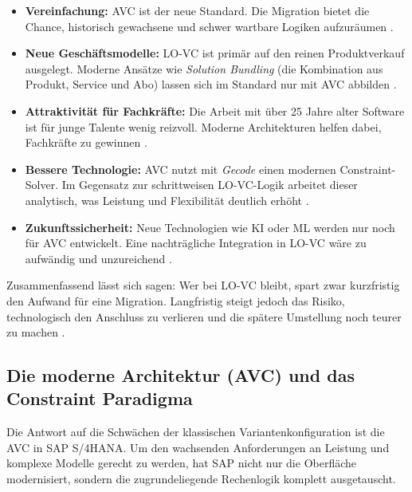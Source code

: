 \begin{itemize}
\item \textbf{Vereinfachung:} \ac{AVC} ist der neue Standard. Die Migration bietet die Chance, historisch gewachsene und schwer wartbare Logiken aufzuräumen \parencite[S. 57]{blumohrAdvancedVariantConfiguration2023}.
\item \textbf{Neue Geschäftsmodelle:} \ac{LO-VC} ist primär auf den reinen Produktverkauf ausgelegt. Moderne Ansätze wie \textit{Solution Bundling} (die Kombination aus Produkt, Service und Abo) lassen sich im Standard nur mit \ac{AVC} abbilden \parencite[S. 59]{blumohrAdvancedVariantConfiguration2023}.
\item \textbf{Attraktivität für Fachkräfte:} Die Arbeit mit über 25 Jahre alter Software ist für junge Talente wenig reizvoll. Moderne Architekturen helfen dabei, Fachkräfte zu gewinnen \parencite[S. 60]{blumohrAdvancedVariantConfiguration2023}.
\item \textbf{Bessere Technologie:} \ac{AVC} nutzt mit \textit{Gecode} einen modernen Constraint-Solver. Im Gegensatz zur schrittweisen \ac{LO-VC}-Logik arbeitet dieser analytisch, was Leistung und Flexibilität deutlich erhöht \parencite[S. 59]{blumohrAdvancedVariantConfiguration2023}.
\item \textbf{Zukunftssicherheit:} Neue Technologien wie \ac{KI} oder \ac{ML} werden nur noch für \ac{AVC} entwickelt. Eine nachträgliche Integration in \ac{LO-VC} wäre zu aufwändig und unzureichend \parencite[S. 61]{blumohrAdvancedVariantConfiguration2023}.
\end{itemize}

Zusammenfassend lässt sich sagen: Wer bei \ac{LO-VC} bleibt, spart zwar kurzfristig den Aufwand für eine Migration. Langfristig steigt jedoch das Risiko, technologisch den Anschluss zu verlieren und die spätere Umstellung noch teurer zu machen \parencite[S. 61]{blumohrAdvancedVariantConfiguration2023}.

\subsection{Die moderne Architektur (AVC) und das Constraint Paradigma}
\label{sec:avc_constraint}

Die Antwort auf die Schwächen der klassischen Variantenkonfiguration ist die \ac{AVC} in SAP S/4HANA. Um den wachsenden Anforderungen an Leistung und komplexe Modelle gerecht zu werden, hat SAP nicht nur die Oberfläche modernisiert, sondern die zugrundeliegende Rechenlogik komplett ausgetauscht.

